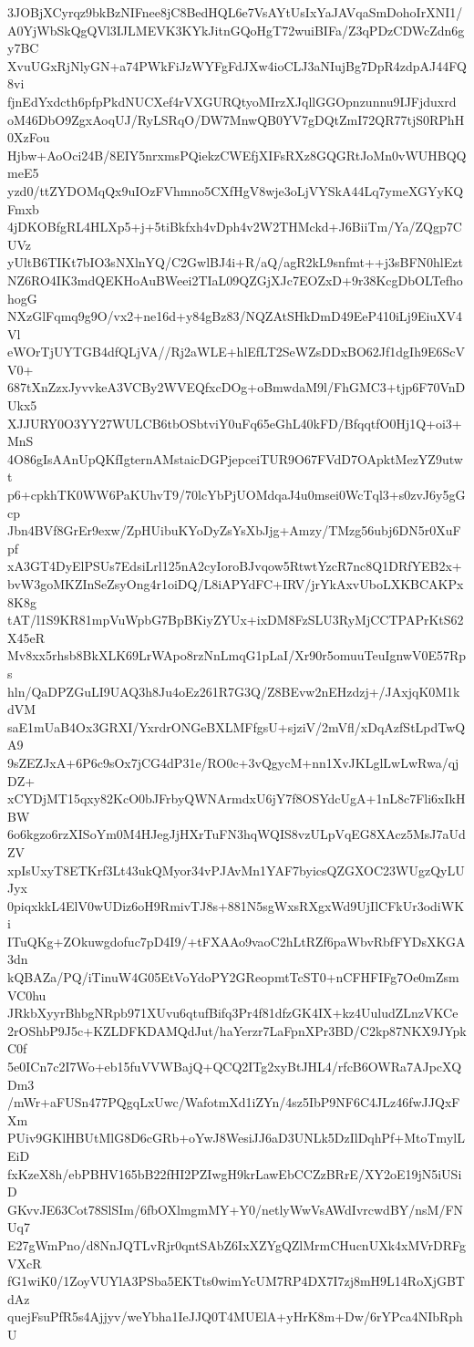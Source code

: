 3JOBjXCyrqz9bkBzNIFnee8jC8BedHQL6e7VsAYtUsIxYaJAVqaSmDohoIrXNI1/
A0YjWbSkQgQVl3IJLMEVK3KYkJitnGQoHgT72wuiBIFa/Z3qPDzCDWcZdn6gy7BC
XvuUGxRjNlyGN+a74PWkFiJzWYFgFdJXw4ioCLJ3aNIujBg7DpR4zdpAJ44FQ8vi
fjnEdYxdcth6pfpPkdNUCXef4rVXGURQtyoMIrzXJqllGGOpnzunnu9IJFjduxrd
oM46DbO9ZgxAoqUJ/RyLSRqO/DW7MnwQB0YV7gDQtZmI72QR77tjS0RPhH0XzFou
Hjbw+AoOci24B/8EIY5nrxmsPQiekzCWEfjXIFsRXz8GQGRtJoMn0vWUHBQQmeE5
yzd0/ttZYDOMqQx9uIOzFVhmno5CXfHgV8wje3oLjVYSkA44Lq7ymeXGYyKQFmxb
4jDKOBfgRL4HLXp5+j+5tiBkfxh4vDph4v2W2THMckd+J6BiiTm/Ya/ZQgp7CUVz
yUltB6TIKt7bIO3sNXlnYQ/C2GwlBJ4i+R/aQ/agR2kL9snfmt++j3sBFN0hlEzt
NZ6RO4IK3mdQEKHoAuBWeei2TIaL09QZGjXJc7EOZxD+9r38KcgDbOLTefhohogG
NXzGlFqmq9g9O/vx2+ne16d+y84gBz83/NQZAtSHkDmD49EeP410iLj9EiuXV4Vl
eWOrTjUYTGB4dfQLjVA//Rj2aWLE+hlEfLT2SeWZsDDxBO62Jf1dgIh9E6ScVV0+
687tXnZzxJyvvkeA3VCBy2WVEQfxcDOg+oBmwdaM9l/FhGMC3+tjp6F70VnDUkx5
XJJURY0O3YY27WULCB6tbOSbtviY0uFq65eGhL40kFD/BfqqtfO0Hj1Q+oi3+MnS
4O86gIsAAnUpQKfIgternAMstaicDGPjepceiTUR9O67FVdD7OApktMezYZ9utwt
p6+cpkhTK0WW6PaKUhvT9/70lcYbPjUOMdqaJ4u0msei0WcTql3+s0zvJ6y5gGcp
Jbn4BVf8GrEr9exw/ZpHUibuKYoDyZsYsXbJjg+Amzy/TMzg56ubj6DN5r0XuFpf
xA3GT4DyElPSUs7EdsiLrl125nA2cyIoroBJvqow5RtwtYzcR7nc8Q1DRfYEB2x+
bvW3goMKZInSeZsyOng4r1oiDQ/L8iAPYdFC+IRV/jrYkAxvUboLXKBCAKPx8K8g
tAT/l1S9KR81mpVuWpbG7BpBKiyZYUx+ixDM8FzSLU3RyMjCCTPAPrKtS62X45eR
Mv8xx5rhsb8BkXLK69LrWApo8rzNnLmqG1pLaI/Xr90r5omuuTeuIgnwV0E57Rps
hln/QaDPZGuLI9UAQ3h8Ju4oEz261R7G3Q/Z8BEvw2nEHzdzj+/JAxjqK0M1kdVM
saE1mUaB4Ox3GRXI/YxrdrONGeBXLMFfgsU+sjziV/2mVfl/xDqAzfStLpdTwQA9
9sZEZJxA+6P6c9sOx7jCG4dP31e/RO0c+3vQgycM+nn1XvJKLglLwLwRwa/qjDZ+
xCYDjMT15qxy82KcO0bJFrbyQWNArmdxU6jY7f8OSYdcUgA+1nL8c7Fli6xIkHBW
6o6kgzo6rzXISoYm0M4HJegJjHXrTuFN3hqWQIS8vzULpVqEG8XAcz5MsJ7aUdZV
xpIsUxyT8ETKrf3Lt43ukQMyor34vPJAvMn1YAF7byicsQZGXOC23WUgzQyLUJyx
0piqxkkL4ElV0wUDiz6oH9RmivTJ8s+881N5sgWxsRXgxWd9UjIlCFkUr3odiWKi
ITuQKg+ZOkuwgdofuc7pD4I9/+tFXAAo9vaoC2hLtRZf6paWbvRbfFYDsXKGA3dn
kQBAZa/PQ/iTinuW4G05EtVoYdoPY2GReopmtTcST0+nCFHFIFg7Oe0mZsmVC0hu
JRkbXyyrBhbgNRpb971XUvu6qtufBifq3Pr4f81dfzGK4IX+kz4UuludZLnzVKCe
2rOShbP9J5c+KZLDFKDAMQdJut/haYerzr7LaFpnXPr3BD/C2kp87NKX9JYpkC0f
5e0ICn7c2I7Wo+eb15fuVVWBajQ+QCQ2ITg2xyBtJHL4/rfcB6OWRa7AJpcXQDm3
/mWr+aFUSn477PQgqLxUwc/WafotmXd1iZYn/4sz5IbP9NF6C4JLz46fwJJQxFXm
PUiv9GKlHBUtMlG8D6cGRb+oYwJ8WesiJJ6aD3UNLk5DzIlDqhPf+MtoTmylLEiD
fxKzeX8h/ebPBHV165bB22fHI2PZIwgH9krLawEbCCZzBRrE/XY2oE19jN5iUSiD
GKvvJE63Cot78SlSIm/6fbOXlmgmMY+Y0/netlyWwVsAWdIvrcwdBY/nsM/FNUq7
E27gWmPno/d8NnJQTLvRjr0qntSAbZ6IxXZYgQZlMrmCHucnUXk4xMVrDRFgVXcR
fG1wiK0/1ZoyVUYlA3PSba5EKTts0wimYcUM7RP4DX7I7zj8mH9L14RoXjGBTdAz
quejFsuPfR5s4Ajjyv/weYbha1IeJJQ0T4MUElA+yHrK8m+Dw/6rYPca4NIbRphU
